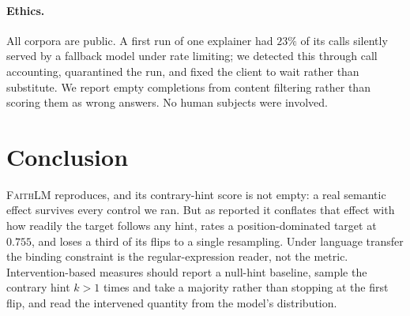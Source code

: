 \documentclass[11pt]{article}
\begin{document}
\paragraph{Ethics.} All corpora are public. A first run of one explainer had
$23\%$ of its calls silently served by a fallback model under rate limiting; we
detected this through call accounting, quarantined the run, and fixed the client
to wait rather than substitute. We report empty completions from content
filtering rather than scoring them as wrong answers. No human subjects were
involved.

\section{Conclusion}

\textsc{FaithLM} reproduces, and its contrary-hint score is not empty: a real
semantic effect survives every control we ran. But as reported it conflates that
effect with how readily the target follows any hint, rates a position-dominated
target at $0.755$, and loses a third of its flips to a single resampling. Under
language transfer the binding constraint is the regular-expression reader, not
the metric. Intervention-based measures should report a null-hint baseline,
sample the contrary hint $k>1$ times and take a majority rather than stopping at
the first flip, and read the intervened quantity from the model's distribution.



\end{document}
